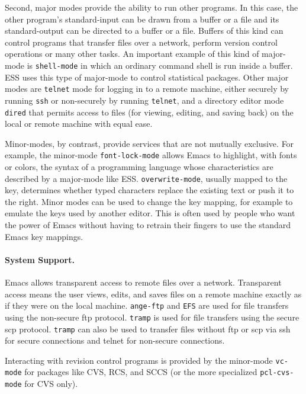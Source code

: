 \documentclass{article}
\newcommand{\stexttt}[1]{{\small\texttt{#1}}}
\newcommand{\ssf}[1]{{\small\sf{#1}}}
\begin{document}
Second, major modes provide the ability to run other programs.  In
this case, the other program's standard-input can be drawn from a
buffer or a file and its standard-output can be directed to a buffer
or a file.  Buffers of this kind can control programs that transfer
files over a network, perform version control operations or many other
tasks.  An important example of this kind of major-mode is
\stexttt{shell-mode} in which an ordinary command shell is run inside
a buffer.  ESS uses this type of major-mode to control statistical
packages.  Other major modes are \stexttt{telnet} mode for logging in
to a remote machine, either securely by running \stexttt{ssh} or
non-securely by running \stexttt{telnet}, and a directory editor mode
\stexttt{dired} that permits access to files (for viewing, editing,
and saving back) on the local or remote machine with equal ease.

Minor-modes, by contrast, provide services that are not mutually
exclusive.  For example, the minor-mode \stexttt{font-lock-mode}
allows Emacs to highlight, with fonts or colors, the syntax of a
programming language whose characteristics are described by a
major-mode like ESS.  \stexttt{overwrite-mode}, usually mapped to the
\ssf{Insert} key, determines whether typed characters replace the
existing text or push it to the right.  Minor modes can be used to
change the key mapping, for example to emulate the keys used by
another editor.  This is often used by people who want the power of
Emacs without having to retrain their fingers to use the standard
Emacs key mappings.


\paragraph{System Support.}
Emacs allows transparent access to remote files over a network.  
Transparent access means the user views, edits, and saves files on
a remote machine exactly as if they were on the local machine.
\stexttt{ange-ftp} and \stexttt{EFS} are used
for file transfers using the non-secure ftp protocol.
\stexttt{tramp} is used for file transfers using the secure scp protocol.
\stexttt{tramp} can also be used to transfer files without ftp or scp
via ssh for secure connections and telnet for non-secure connections.

Interacting with revision control programs is provided by the
minor-mode \stexttt{vc-mode} for packages like CVS, RCS, and SCCS (or
the more specialized \stexttt{pcl-cvs-mode} for CVS only).
\end{document}
